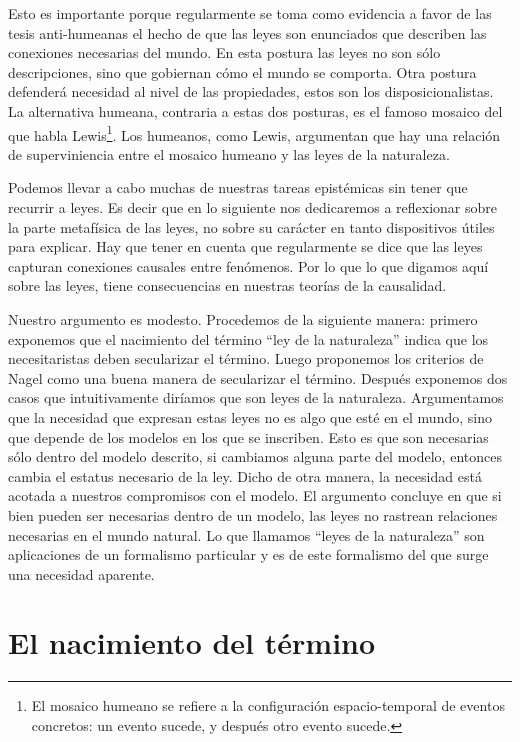 Esto es importante porque regularmente se toma como evidencia a favor de las tesis anti-humeanas el hecho de que las leyes son enunciados que describen las conexiones necesarias del mundo. En esta postura las leyes no son sólo descripciones, sino que gobiernan cómo el mundo se comporta\cite{Bhogal2020}. Otra postura defenderá necesidad al nivel de las propiedades, estos son los disposicionalistas. La alternativa humeana, contraria a estas dos posturas, es el famoso mosaico del que habla Lewis\footnote{El mosaico humeano se refiere a la configuración espacio-temporal de eventos concretos: un evento sucede, y después otro evento sucede.}. Los humeanos, como Lewis, argumentan que hay una relación de superviniencia entre el mosaico humeano y las leyes de la naturaleza.

Podemos llevar a cabo muchas de nuestras tareas epistémicas sin tener que recurrir a leyes. Es decir que en lo siguiente nos dedicaremos a reflexionar sobre la parte metafísica de las leyes, no sobre su carácter en tanto dispositivos útiles para explicar. Hay que tener en cuenta que regularmente se dice que las leyes capturan conexiones causales entre fenómenos. Por lo que lo que digamos aquí sobre las leyes, tiene consecuencias en nuestras teorías de la causalidad.

Nuestro argumento es modesto. Procedemos de la siguiente manera: primero exponemos que el nacimiento del término ``ley de la naturaleza'' indica que los necesitaristas deben secularizar el término. Luego proponemos los criterios de Nagel como una buena manera de secularizar el término. Después exponemos dos casos que intuitivamente diríamos que son leyes de la naturaleza. Argumentamos que la necesidad que expresan estas leyes no es algo que esté en el mundo, sino que depende de los modelos en los que se inscriben. Esto es que son necesarias sólo dentro del modelo descrito, si cambiamos alguna parte del modelo, entonces cambia el estatus necesario de la ley. Dicho de otra manera, la necesidad está acotada a nuestros compromisos con el modelo. El argumento concluye en que si bien pueden ser necesarias dentro de un modelo, las leyes no rastrean relaciones necesarias en el mundo natural. Lo que llamamos ``leyes de la naturaleza'' son aplicaciones de un formalismo particular y es de este formalismo del que surge una necesidad aparente.

\section{El nacimiento del término}

